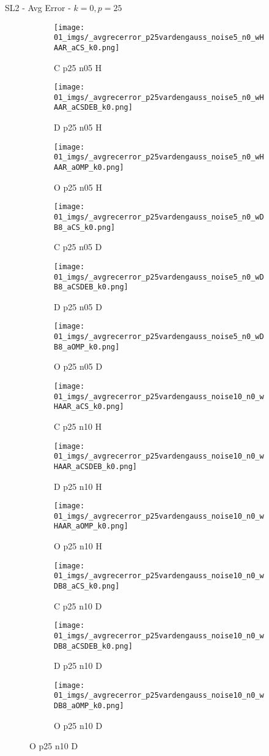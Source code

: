 \begin{frame}{SL2 - Avg Error - $k=0,p=25$}{}
\begin{figure}
\begin{subfigure}{0.13\textwidth}
\texttt{[image: 01\_imgs/\_avgrecerror\_p25vardengauss\_noise5\_n0\_wHAAR\_aCS\_k0.png]}
\caption*{\tiny C p25 n05 H}
\end{subfigure}
\begin{subfigure}{0.13\textwidth}
\texttt{[image: 01\_imgs/\_avgrecerror\_p25vardengauss\_noise5\_n0\_wHAAR\_aCSDEB\_k0.png]}
\caption*{\tiny D p25 n05 H}
\end{subfigure}
\begin{subfigure}{0.13\textwidth}
\texttt{[image: 01\_imgs/\_avgrecerror\_p25vardengauss\_noise5\_n0\_wHAAR\_aOMP\_k0.png]}
\caption*{\tiny O p25 n05 H}
\end{subfigure}
\begin{subfigure}{0.13\textwidth}
\texttt{[image: 01\_imgs/\_avgrecerror\_p25vardengauss\_noise5\_n0\_wDB8\_aCS\_k0.png]}
\caption*{\tiny C p25 n05 D}
\end{subfigure}
\begin{subfigure}{0.13\textwidth}
\texttt{[image: 01\_imgs/\_avgrecerror\_p25vardengauss\_noise5\_n0\_wDB8\_aCSDEB\_k0.png]}
\caption*{\tiny D p25 n05 D}
\end{subfigure}
\begin{subfigure}{0.13\textwidth}
\texttt{[image: 01\_imgs/\_avgrecerror\_p25vardengauss\_noise5\_n0\_wDB8\_aOMP\_k0.png]}
\caption*{\tiny O p25 n05 D}
\end{subfigure}

\vspace{5pt}

\begin{subfigure}{0.13\textwidth}
\texttt{[image: 01\_imgs/\_avgrecerror\_p25vardengauss\_noise10\_n0\_wHAAR\_aCS\_k0.png]}
\caption*{\tiny C p25 n10 H}
\end{subfigure}
\begin{subfigure}{0.13\textwidth}
\texttt{[image: 01\_imgs/\_avgrecerror\_p25vardengauss\_noise10\_n0\_wHAAR\_aCSDEB\_k0.png]}
\caption*{\tiny D p25 n10 H}
\end{subfigure}
\begin{subfigure}{0.13\textwidth}
\texttt{[image: 01\_imgs/\_avgrecerror\_p25vardengauss\_noise10\_n0\_wHAAR\_aOMP\_k0.png]}
\caption*{\tiny O p25 n10 H}
\end{subfigure}
\begin{subfigure}{0.13\textwidth}
\texttt{[image: 01\_imgs/\_avgrecerror\_p25vardengauss\_noise10\_n0\_wDB8\_aCS\_k0.png]}
\caption*{\tiny C p25 n10 D}
\end{subfigure}
\begin{subfigure}{0.13\textwidth}
\texttt{[image: 01\_imgs/\_avgrecerror\_p25vardengauss\_noise10\_n0\_wDB8\_aCSDEB\_k0.png]}
\caption*{\tiny D p25 n10 D}
\end{subfigure}
\begin{subfigure}{0.13\textwidth}
\texttt{[image: 01\_imgs/\_avgrecerror\_p25vardengauss\_noise10\_n0\_wDB8\_aOMP\_k0.png]}
\caption*{\tiny O p25 n10 D}
\end{subfigure}


\end{figure}
\end{frame}
